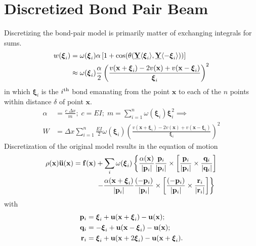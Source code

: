 \section{Discretized Bond Pair Beam}
Discretizing the bond-pair model is primarily matter of exchanging integrals for sums. 
%
\begin{align}
%
w(\boldsymbol{\xi}_i) &= \omega(\boldsymbol{\xi}_i)\alpha \left[1+\cos(\theta(\vstate{Y}{}{\boldsymbol{\xi}_i},\vstate{Y}{}{-\boldsymbol{\xi}_i})) \right] \notag \\
&\approx \omega(\boldsymbol{\xi}_i)\frac{\alpha}{2}\left(\frac{v(\mathbf{x}+\boldsymbol{\xi}_i)-2v(\mathbf{x})+v(\mathbf{x}-\boldsymbol{\xi}_i)}{\boldsymbol{\xi}_i}\right)^2\notag
\end{align}
%
in which $\boldsymbol{\xi}_i$ is the $i^\textnormal{th}$ bond emanating from the point $\mathbf{x}$ to each of the $n$ points within distance $\delta$ of point $\mathbf{x}$.
%
\begin{align}
\label{eq:discreteBeamw}
\alpha &= \frac{c\; \Delta x}{m} ;\; c= EI ;\; m=\sum_{i=1}^n \omega(\boldsymbol{\xi}_i)\boldsymbol{\xi}_i^2 \implies \nonumber \\
W&=\Delta x \sum_{i=1}^n \frac{EI}{2}\omega(\boldsymbol{\xi}_i)\left(\frac{v(\mathbf{x}+\boldsymbol{\xi}_i)-2v(\mathbf{x})+v(\mathbf{x}-\boldsymbol{\xi}_i)}{\boldsymbol{\xi}_i}\right)^2
\end{align}
%
Discretization of the original model results in the equation of motion
\begin{align}
\rho(\mathbf{x})\mathbf{\ddot{u}}(\mathbf{x}) = \mathbf{f}(\mathbf{x})&+\sum_i \omega(\boldsymbol{\xi}_i)\left\{\frac{\alpha(\mathbf{x})}{|\mathbf{p}_i |}\frac{\mathbf{p}_i}{|\mathbf{p}_i |}\times \left[ \frac{\mathbf{p}_i}{|\mathbf{p}_i |}\times \frac{\mathbf{q}_i}{|\mathbf{q}_i |}\right] \right. \notag \\
& \left. -\frac{\alpha(\mathbf{x}+\boldsymbol{\xi}_i)}{|\mathbf{p}_i |}\frac{(-\mathbf{p}_i)}{|\mathbf{p}_i |}\times\left[\frac{(-\mathbf{p}_i)}{|\mathbf{p}_i |}\times \frac{\mathbf{r}_i}{|\mathbf{r}_i |} \right] \right\} 
\label{eq:discretebeamEoM}
\end{align}
with
\begin{align}
\mathbf{p}_i &= \boldsymbol{\xi}_i+\mathbf{u}(\mathbf{x}+\boldsymbol{\xi}_i)-\mathbf{u}(\mathbf{x});\notag\\
\mathbf{q}_i &= -\boldsymbol{\xi}_i+\mathbf{u}(\mathbf{x}-\boldsymbol{\xi}_i)-\mathbf{u}(\mathbf{x});\notag\\
\mathbf{r}_i &= \boldsymbol{\xi}_i+\mathbf{u}(\mathbf{x}+2\boldsymbol{\xi}_i)-\mathbf{u}(\mathbf{x}+\boldsymbol{\xi}_i).\notag
\end{align}
